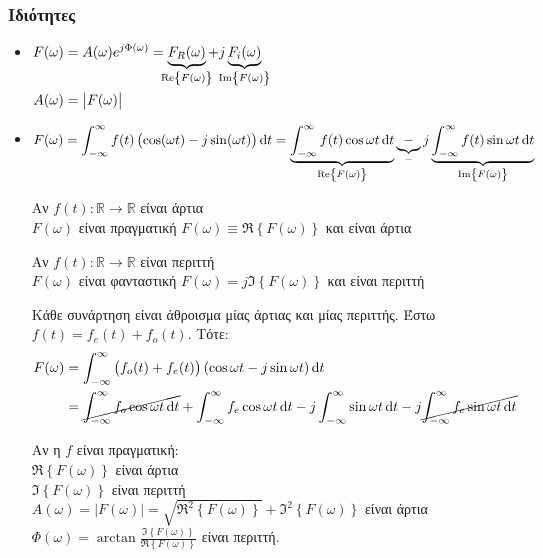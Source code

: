      \subsubsection{Ιδιότητες}
     \begin{itemize}

     \item\( 
     \begin{aligned}[t]
     F(\omega)&= A(\omega )e^{j\Phi(\omega )} =
     \underbrace{F_R(\omega )}_{\mathclap{\Re\left\lbrace F(\omega ) \right\rbrace}}
     +j\underbrace{F_i(\omega )}_{\mathclap{\Im\left\lbrace F(\omega ) \right\rbrace}}
     \\ A(\omega )&=\left| F(\omega ) \right|
     \end{aligned}\)
     \item \( \displaystyle
     F(\omega )=\int_{-\infty}^{\infty} f(t)\left(\cos(\omega t)-j\sin(\omega t)\right)
     \dif t = \underbrace{\int_{-\infty}^{\infty} f(t)\cos\omega t\dif t}_{%
        \Re\left\lbrace F(\omega ) \right\rbrace
        }
        \underbrace{-}_{-}
        j \underbrace{\int_{-\infty}^{\infty} f(t)\sin\omega t\dif t}_{%
            \Im\left\lbrace F(\omega ) \right\rbrace
            }
     \)
     
     Αν \( f(t):\mathbb R \to\mathbb R  \) είναι άρτια\\
     \( F(\omega ) \) είναι πραγματική \quad \( 
     F(\omega ) \equiv \Re\left\lbrace F(\omega ) \right\rbrace
      \) και είναι άρτια
      
     Αν \( f(t):\mathbb R \to\mathbb R  \) είναι περιττή\\
     \( F(\omega ) \) είναι φανταστική \quad \( 
     F(\omega ) = j\Im \left\lbrace F(\omega) \right\rbrace
      \) και είναι περιττή
      
     Κάθε συνάρτηση είναι άθροισμα μίας άρτιας και μίας περιττής. Έστω
     \( f(t) = f_e(t)+f_o(t) \). Τότε:
     \begin{align*}
     F(\omega ) &= \int_{-\infty}^{\infty} \left(
     f_o(t)+f_e(t)
     \right)(\cos\omega t -j\sin \omega t)\dif t
     \\ &= \cancel{\int_{-\infty}^{\infty} f_o\cos\omega t\dif t}
     + \int_{-\infty}^{\infty} f_e\cos\omega t\dif t
     - j\int_{-\infty}^{\infty} \sin\omega t\dif t
     - j \cancel{\int_{-\infty}^{\infty} f_e\sin\omega t\dif t }
     \end{align*}
     
     Αν η \( f \) είναι πραγματική: \\
     \( \Re\left\lbrace F(\omega ) \right\rbrace \) είναι άρτια \\
     \( \Im\left\lbrace F(\omega ) \right\rbrace \) είναι περιττή \\
     \( A(\omega)=\left|F(\omega )\right| = 
     \sqrt{\Re^2\left\lbrace F(\omega ) \right\rbrace}
     +\Im^2\left\lbrace F(\omega) \right\rbrace
      \) είναι άρτια\\
      \( \Phi(\omega) =\arctan
      \frac{\Im\left\lbrace F(\omega) \right\rbrace}%
      {\Re\left\lbrace F(\omega ) \right\rbrace}
       \) είναι περιττή.
       

\end{itemize}
